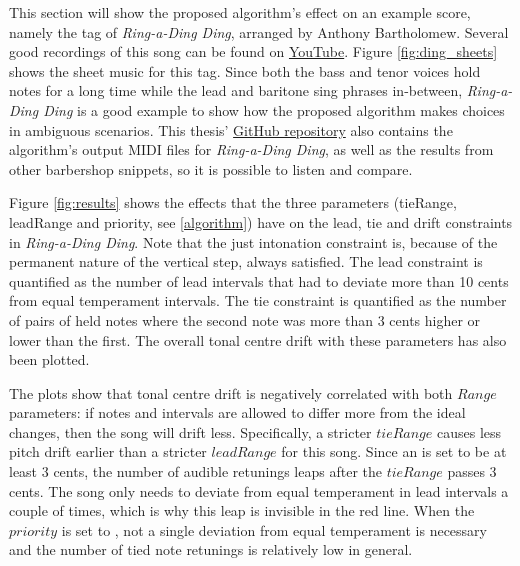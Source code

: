 \documentclass[a4paper]{article}
\begin{document}
This section will show the proposed algorithm's effect on an example score, namely the tag of \textit{Ring-a-Ding Ding}, arranged by Anthony Bartholomew. Several good recordings of this song can be found on \href{https://www.youtube.com/watch?v=G40I5JDtfjI&t=147s}{YouTube}. Figure \ref{fig:ding_sheets} shows the sheet music for this tag. \cite{noauthor_barbershop_nodate} Since both the bass and tenor voices hold notes for a long time while the lead and baritone sing phrases in-between, \textit{Ring-a-Ding Ding} is a good example to show how the proposed algorithm makes choices in ambiguous scenarios. This thesis' \href{https://github.com/teuncb/adaptivebarbershop}{GitHub repository} also contains the algorithm's output MIDI files for \textit{Ring-a-Ding Ding}, as well as the results from other barbershop snippets, so it is possible to listen and compare.

Figure \ref{fig:results} shows the effects that the three parameters (tieRange, leadRange and priority, see \ref{algorithm}) have on the lead, tie and drift constraints in \textit{Ring-a-Ding Ding}. Note that the just intonation constraint is, because of the permanent nature of the vertical step, always satisfied. The lead constraint is quantified as the number of lead intervals that had to deviate more than 10 cents from equal temperament intervals. The tie constraint is quantified as the number of pairs of held notes where the second note was more than 3 cents higher or lower than the first. The overall tonal centre drift with these parameters has also been plotted.

The plots show that tonal centre drift is negatively correlated with both $\mathit{Range}$ parameters: if notes and intervals are allowed to differ more from the ideal changes, then the song will drift less. Specifically, a stricter $\mathit{tieRange}$ causes less pitch drift earlier than a stricter $\mathit{leadRange}$ for this song. Since an  is set to be at least 3 cents, the number of audible retunings leaps after the $\mathit{tieRange}$ passes 3 cents. The song only needs to deviate from equal temperament in lead intervals a couple of times, which is why this leap is invisible in the red line. When the $\mathit{priority}$ is set to , not a single deviation from equal temperament is necessary and the number of tied note retunings is relatively low in general.
\end{document}
